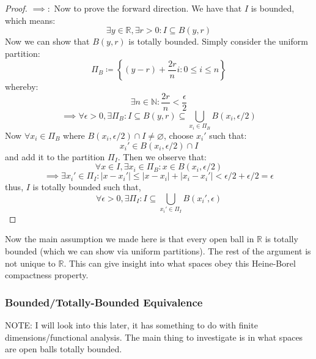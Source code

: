 \documentclass[10pt,letterpaper]{article} %
\begin{document}
\begin{proof}
$\implies:$ Now to prove the forward direction. We have that $I$ is bounded, which means:
\begin{equation*}
\exists y \in \mathbb{R}, \exists r > 0: I \subseteq B(y, r)
\end{equation*}
Now we can show that $B(y, r)$ is totally bounded. Simply consider the uniform partition:
\begin{equation*}
\Pi_B \coloneq \left\{(y-r) + \frac{2r}{n}i: 0 \leqslant i \leqslant n\right\}
\end{equation*}
whereby:
\begin{equation*}
\exists n \in \mathbb{N}: \frac{2r}{n} < \frac{\epsilon}{2}
\end{equation*}
\begin{equation*}
\implies \forall \epsilon > 0, \exists \Pi_B: I \subseteq B(y, r) \subseteq \bigcup_{x_i \in \Pi_B}B(x_i, \epsilon/2)
\end{equation*}
Now $\forall x_i \in \Pi_B$ where $B(x_i, \epsilon/2) \cap I \neq \varnothing$, choose $x_i'$ such that:
\begin{equation*}
x_i' \in B(x_i, \epsilon/2) \cap I
\end{equation*}
and add it to the partition $\Pi_I$. Then we observe that:
\begin{equation*}
\forall x \in I, \exists x_i \in \Pi_B: x \in B(x_i, \epsilon/2)
\end{equation*}
\begin{equation*}
\implies \exists x_i' \in \Pi_I: |x - x_i'| \leqslant |x - x_i| + |x_i - x_i'| < \epsilon/2 + \epsilon/2 = \epsilon
\end{equation*}
thus, $I$ is totally bounded such that,
\begin{equation*}
\forall \epsilon > 0, \exists \Pi_I: I \subseteq \bigcup_{x_i' \in \Pi_I}B(x_i', \epsilon)
\end{equation*}
\end{proof}
Now the main assumption we made here is that every open ball in $\mathbb{R}$ is totally bounded (which we can show via uniform partitions). The rest of the argument is not unique to $\mathbb{R}$. This can give insight into what spaces obey this Heine-Borel compactness property.

\subsubsection{Bounded/Totally-Bounded Equivalence}
NOTE: I will look into this later, it has something to do with finite dimensions/functional analysis. The main thing to investigate is in what spaces are open balls totally bounded.
\end{document}
